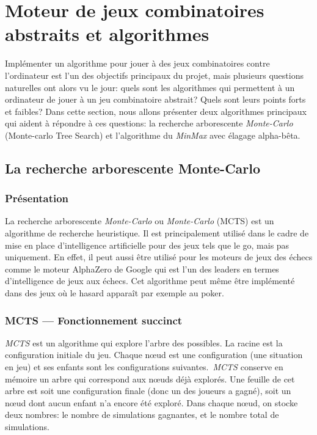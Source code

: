 \section{Moteur de jeux combinatoires abstraits et algorithmes}





Implémenter un algorithme pour jouer à des jeux combinatoires contre l'ordinateur est l'un des objectifs principaux du projet, 
mais plusieurs questions naturelles ont alors vu le jour: quels sont les algorithmes qui permettent à un ordinateur
de jouer à un jeu combinatoire abstrait? Quels sont leurs points forts et faibles? Dans cette section, nous allons
présenter deux algorithmes principaux qui aident à répondre à ces questions: la recherche arborescente \emph{Monte-Carlo} (Monte-carlo Tree Search) 
et l'algorithme du \emph{MinMax} avec élagage alpha-bêta.

\subsection{La recherche arborescente Monte-Carlo}

\subsubsection{Présentation}
La recherche arborescente \emph{Monte-Carlo} ou \emph{Monte-Carlo} (MCTS) est un algorithme de recherche heuristique.
Il est principalement utilisé dans le cadre de mise en place d'intelligence artificielle pour des jeux tels que le go, mais pas uniquement.
En effet, il peut aussi être utilisé pour les moteurs de jeux des échecs comme le moteur AlphaZero de Google qui est
l'un des leaders en termes d'intelligence de jeux aux échecs. Cet algorithme peut même être implémenté dans des jeux où le hasard 
apparaît par exemple au poker.

\subsubsection{MCTS --- Fonctionnement succinct}
\emph{MCTS} est un algorithme qui explore l'arbre des possibles. La racine est la configuration initiale du jeu.
Chaque nœud est une configuration (une situation en jeu) et ses enfants sont les configurations suivantes.\ \emph{MCTS} conserve en mémoire 
un arbre qui correspond aux nœuds déjà explorés. Une feuille de cet arbre est soit une configuration finale (donc un des joueurs a gagné),
soit un nœud dont aucun enfant n'a encore été exploré. Dans chaque nœud, on stocke deux nombres: le nombre de simulations gagnantes, 
et le nombre total de simulations. 

